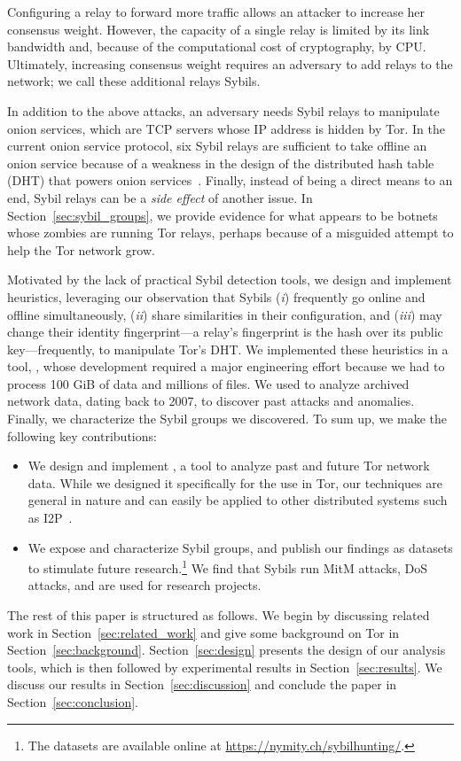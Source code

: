 Configuring a relay to forward more traffic allows an attacker to increase her
consensus weight.  However, the capacity of a single relay is limited by its
link bandwidth and, because of the computational cost of cryptography, by CPU.
Ultimately, increasing consensus weight requires an adversary to add relays to
the network; we call these additional relays Sybils.

In addition to the above attacks, an adversary needs Sybil relays to manipulate
onion services, which are TCP servers whose IP address is hidden by Tor.  In the
current onion service protocol, six Sybil relays are sufficient to take offline
an onion service because of a weakness in the design of the distributed hash
table (DHT) that powers onion services~\cite{Biryukov2013a}.  Finally, instead
of being a direct means to an end, Sybil relays can be a \emph{side effect} of
another issue.  In Section~\ref{sec:sybil_groups}, we provide evidence for what
appears to be botnets whose zombies are running Tor relays, perhaps because of a
misguided attempt to help the Tor network grow.

Motivated by the lack of practical Sybil detection tools, we design and
implement heuristics, leveraging our observation that Sybils (\emph{i})
frequently go online and offline simultaneously, (\emph{ii}) share similarities
in their configuration, and (\emph{iii}) may change their identity
fingerprint---a relay's fingerprint is the hash over its public
key---frequently, to manipulate Tor's DHT.  We implemented these heuristics in
a tool, \sys, whose development required a major engineering effort because we
had to process 100 GiB of data and millions of files.  We used \sys to analyze
archived network data, dating back to 2007, to discover past attacks and
anomalies.  Finally, we characterize the Sybil groups we discovered.  To sum
up, we make the following key contributions:
\begin{itemize}
	\item We design and implement \sys, a tool to analyze past and future Tor
		network data.  While we designed it specifically for the use in Tor, our
		techniques are general in nature and can easily be applied to other
		distributed systems such as I2P~\cite{i2p}.
	\item We expose and characterize Sybil groups, and publish our findings as
		datasets to stimulate future research.\footnote{The datasets are
		available online at \url{https://nymity.ch/sybilhunting/}.} We find
		that Sybils run MitM attacks, DoS attacks, and are used for research
		projects.
\end{itemize}

The rest of this paper is structured as follows.  We begin by discussing related
work in Section~\ref{sec:related_work} and give some background on Tor in
Section~\ref{sec:background}.  Section~\ref{sec:design} presents the design of
our analysis tools, which is then followed by experimental results in
Section~\ref{sec:results}.  We discuss our results in
Section~\ref{sec:discussion} and conclude the paper in
Section~\ref{sec:conclusion}.
